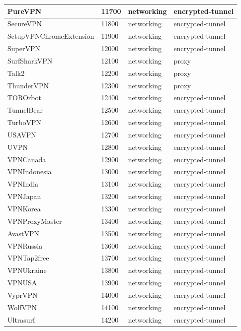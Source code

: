 \begin{longtable}{p{}|p{}|p{}|p{}}
    PureVPN &	11700 &	networking &	encrypted-tunnel \\ \hline
    SecureVPN &	11800 &	networking &	encrypted-tunnel \\ \hline
    SetupVPNChromeExtension &	11900 &	networking &	encrypted-tunnel \\ \hline
    SuperVPN &	12000 &	networking &	encrypted-tunnel \\ \hline
    SurfSharkVPN &	12100 &	networking &	proxy \\ \hline
    Talk2 &	12200 &	networking &	proxy \\ \hline
    ThunderVPN &	12300 &	networking &	proxy \\ \hline
    TOROrbot &	12400 &	networking &	encrypted-tunnel \\ \hline
    TunnelBear &	12500 &	networking &	encrypted-tunnel \\ \hline
    TurboVPN &	12600 &	networking &	encrypted-tunnel \\ \hline
    USAVPN &	12700 &	networking &	encrypted-tunnel \\ \hline
    UVPN &	12800 &	networking &	encrypted-tunnel \\ \hline
    VPNCanada &	12900 &	networking &	encrypted-tunnel \\ \hline
    VPNIndonesia &	13000 &	networking &	encrypted-tunnel \\ \hline
    VPNIndia &	13100 &	networking &	encrypted-tunnel \\ \hline
    VPNJapan &	13200 &	networking &	encrypted-tunnel \\ \hline
    VPNKorea &	13300 &	networking &	encrypted-tunnel \\ \hline
    VPNProxyMaster &	13400 &	networking &	encrypted-tunnel \\ \hline
    AvastVPN &	13500 &	networking &	encrypted-tunnel \\ \hline
    VPNRussia &	13600 &	networking &	encrypted-tunnel \\ \hline
    VPNTap2free &	13700 &	networking &	encrypted-tunnel \\ \hline
    VPNUkraine &	13800 &	networking &	encrypted-tunnel \\ \hline
    VPNUSA &	13900 &	networking &	encrypted-tunnel \\ \hline
    VyprVPN &	14000 &	networking &	encrypted-tunnel \\ \hline
    WolfVPN &	14100 &	networking &	encrypted-tunnel \\ \hline
    Ultrasurf &	14200 &	networking &	encrypted-tunnel \\ \hline

\end{longtable}
